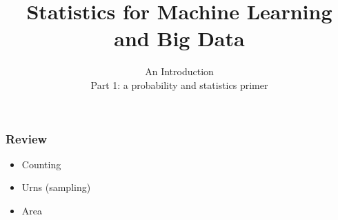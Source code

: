 

\title
{Statistics for Machine Learning and Big Data}
\subtitle{An Introduction\\[6mm] Part 1: a probability and statistics primer}




\begin{frame}
  \titlepage
\end{frame}


\begin{frame}
  \frametitle{Review}
  \begin{itemize}
  \item Counting
  \item Urns (sampling)
  \item Area
  \end{itemize}
\end{frame}

